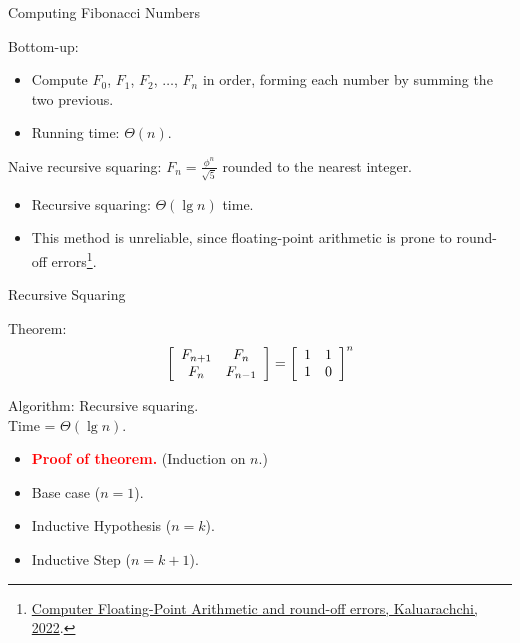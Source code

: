 \documentclass{beamer}
\begin{document}
\begin{frame}{Computing Fibonacci Numbers}
    \begin{alertblock}{Bottom-up:}
        \begin{itemize}
            \item Compute $F_0$, $F_1$, $F_2$, $\ldots$, $F_n$ in order, forming each number by summing the two previous.
            \item Running time: $\Theta(n)$.
        \end{itemize}
    \end{alertblock}
    \pause
    \begin{alertblock}{Naive recursive squaring:}
        $F_n = \frac{\phi^n}{\sqrt{5}}$ rounded to the nearest integer. \pause
        \begin{itemize}
            \item Recursive squaring: $\Theta(\lg n)$ time. \pause
            \item This method is unreliable, since floating-point arithmetic is prone to round-off errors\footnote{\href{https://medium.com/@kusal95/computer-floating-point-arithmetic-and-round-off-errors-5c879c480982}{\tiny Computer Floating-Point Arithmetic and round-off errors, Kaluarachchi, 2022}.}.
        \end{itemize}
    \end{alertblock}
\end{frame}

\begin{frame}{Recursive Squaring}
    \begin{exampleblock}{Theorem:} \pause
        $$
            \left[
                \begin{array}{c c}
                    F_{n + 1} & F_n \\
                    F_n       & F_{n - 1}
                \end{array}
            \right]
            =
            \left[
                \begin{array}{c c}
                    1 & 1 \\
                    1 & 0
                \end{array}
            \right]^n
        $$
    \end{exampleblock} \pause
    \begin{exampleblock}{Algorithm:}
        Recursive squaring. \\
        Time = $\Theta(\lg n)$.
    \end{exampleblock} \pause
    \begin{itemize}
        \item[] \textbf{\textcolor{red}{Proof of theorem.}} \pause (Induction on $n$.) \pause
        \item[] Base case ($n = 1$). \pause
        \item[] Inductive Hypothesis ($n = k$). \pause
        \item[] Inductive Step ($n = k + 1$).
    \end{itemize}
\end{frame}
\end{document}
